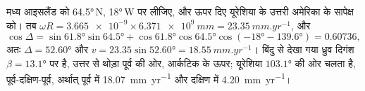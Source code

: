 \begin{example}[आइसलैंड में यूरेशिया उत्तरी अमेरिका से दूर जाता है]\label{ex:b1:plate-kinematics:iceland}
मध्य आइसलैंड को \ang{64.5}\,N, \ang{18}\,W पर लीजिए, और ऊपर दिए यूरेशिया के उत्तरी अमेरिका के सापेक्ष  को। तब $\omega R =
\num{3.665e-9}\times\qty{6.371e9}{mm} = \qty{23.35}{mm.yr^{-1}}$, और
\[
  \cos\Delta = \sin\ang{61.8}\sin\ang{64.5}
  + \cos\ang{61.8}\cos\ang{64.5}\cos(\ang{-18} - \ang{139.6}) = 0.60736,
\]
अतः $\Delta = \ang{52.60}$ और $v = 23.35\sin\ang{52.60} = \qty{18.55}{mm.yr^{-1}}$।
बिंदु से देखा गया ध्रुव दिगंश $\beta = \ang{13.1}$ पर है, उत्तर से थोड़ा पूर्व की ओर, आर्कटिक के ऊपर; यूरेशिया $\ang{103.1}$ की ओर चलता है, पूर्व-दक्षिण-पूर्व, अर्थात् पूर्व में \qty{18.07}{mm.yr^{-1}} और दक्षिण में \qty{4.20}{mm.yr^{-1}}।
\end{example}

